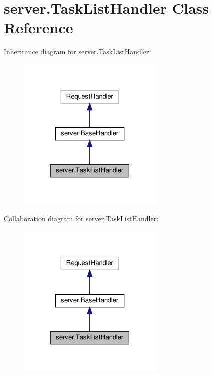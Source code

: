 \hypertarget{classserver_1_1TaskListHandler}{}\section{server.\+Task\+List\+Handler Class Reference}
\label{classserver_1_1TaskListHandler}


Inheritance diagram for server.\+Task\+List\+Handler\+:
\nopagebreak
\begin{figure}[H]
\begin{center}
\leavevmode
\includegraphics[width=198pt]{classserver_1_1TaskListHandler__inherit__graph}
\end{center}
\end{figure}


Collaboration diagram for server.\+Task\+List\+Handler\+:
\nopagebreak
\begin{figure}[H]
\begin{center}
\leavevmode
\includegraphics[width=198pt]{classserver_1_1TaskListHandler__coll__graph}
\end{center}
\end{figure}
